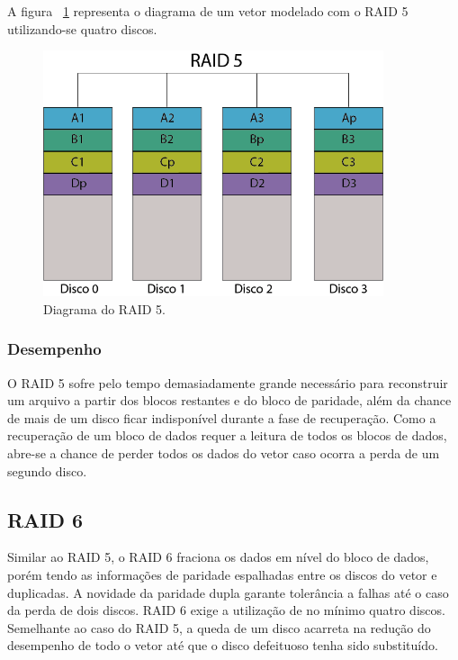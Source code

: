 		A figura ~\ref{fig:raid5} representa o diagrama de um vetor modelado com o RAID 5 utilizando-se quatro discos.\\
		
		\begin{figure}[htb]
			\begin{center}
				
				\includegraphics[clip,width=10.0cm]{images/RAID_5.png}
				\caption{Diagrama do RAID 5. }
				\label{fig:raid5}
			\end{center}
		\end{figure} 
		
		\subsubsection{Desempenho}
		O RAID 5 sofre pelo tempo demasiadamente grande necessário para reconstruir um arquivo a partir dos blocos restantes e do bloco de paridade, além da chance de mais de um disco ficar indisponível durante a fase de recuperação. Como a recuperação de um bloco de dados requer a leitura de todos os blocos de dados, abre-se a chance de perder todos os dados do vetor caso ocorra a perda de um segundo disco.\\
		
		\subsection{RAID 6}
		Similar ao RAID 5, o RAID 6 fraciona os dados em nível do bloco de dados, porém tendo as informações de paridade espalhadas entre os discos do vetor e duplicadas. A novidade da paridade dupla garante tolerância a falhas até o caso da perda de dois discos. RAID 6 exige a utilização de no mínimo quatro discos. \\ 
		
		Semelhante ao caso do RAID 5, a queda de um disco acarreta na redução do desempenho de todo o vetor até que o disco defeituoso tenha sido substituído.\\

